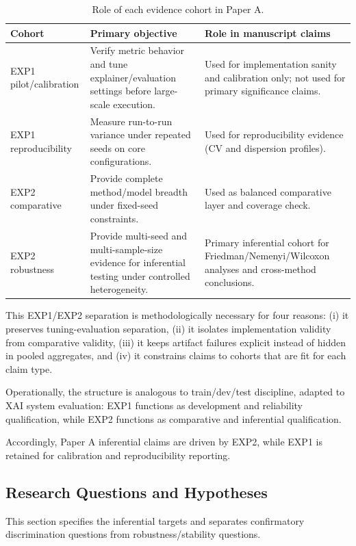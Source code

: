 \documentclass[twoside,11pt]{article}
\begin{document}
\begin{table}[t]
\centering
\caption{Role of each evidence cohort in Paper A.}
\begin{tabularx}{\linewidth}{l X X}
\toprule
\textbf{Cohort} & \textbf{Primary objective} & \textbf{Role in manuscript claims} \\
\midrule
EXP1 pilot/calibration & Verify metric behavior and tune explainer/evaluation settings before large-scale execution. & Used for implementation sanity and calibration only; not used for primary significance claims. \\
EXP1 reproducibility & Measure run-to-run variance under repeated seeds on core configurations. & Used for reproducibility evidence (CV and dispersion profiles). \\
EXP2 comparative & Provide complete method/model breadth under fixed-seed constraints. & Used as balanced comparative layer and coverage check. \\
EXP2 robustness & Provide multi-seed and multi-sample-size evidence for inferential testing under controlled heterogeneity. & Primary inferential cohort for Friedman/Nemenyi/Wilcoxon analyses and cross-method conclusions. \\
\bottomrule
\end{tabularx}
\label{tab:cohorts}
\end{table}

This EXP1/EXP2 separation is methodologically necessary for four reasons: (i) it preserves tuning-evaluation separation, (ii) it isolates implementation validity from comparative validity, (iii) it keeps artifact failures explicit instead of hidden in pooled aggregates, and (iv) it constrains claims to cohorts that are fit for each claim type.

Operationally, the structure is analogous to train/dev/test discipline, adapted to XAI system evaluation: EXP1 functions as development and reliability qualification, while EXP2 functions as comparative and inferential qualification.

Accordingly, Paper A inferential claims are driven by EXP2, while EXP1 is retained for calibration and reproducibility reporting.

\subsection{Research Questions and Hypotheses}
This section specifies the inferential targets and separates confirmatory
discrimination questions from robustness/stability questions.
\end{document}
